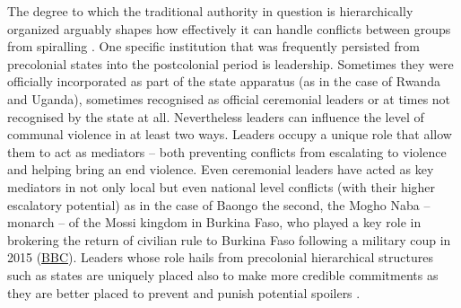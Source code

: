 The degree to which the traditional authority in question is hierarchically
organized arguably shapes how effectively it can handle conflicts between groups
from spiralling \citep[46]{Wig2018}. One specific institution that was
frequently persisted from precolonial states into the postcolonial period is
leadership. Sometimes they were officially incorporated as part of the state
apparatus (as in the case of Rwanda and Uganda), sometimes recognised as
official ceremonial leaders or at times not recognised by the state at all.
Nevertheless leaders can influence the level of communal violence in at least
two ways. Leaders occupy a unique role that allow them to act as mediators -- both
preventing conflicts from escalating to violence and helping bring an end
violence. Even ceremonial leaders have acted as key mediators in not only local
but even national level conflicts (with their higher escalatory potential) as in
the case of Baongo the second, the Mogho Naba -- monarch -- of the Mossi kingdom
in Burkina Faso, who played a key role in brokering the return of civilian rule
to Burkina Faso following a military coup in 2015
(\href{https://www.bbc.com/news/world-africa-34340704}{BBC}). Leaders whose role
hails from precolonial hierarchical structures such as states are uniquely
placed also to make more credible commitments as they are better placed to
prevent and punish potential spoilers \citep{Wig2016}.

% 

